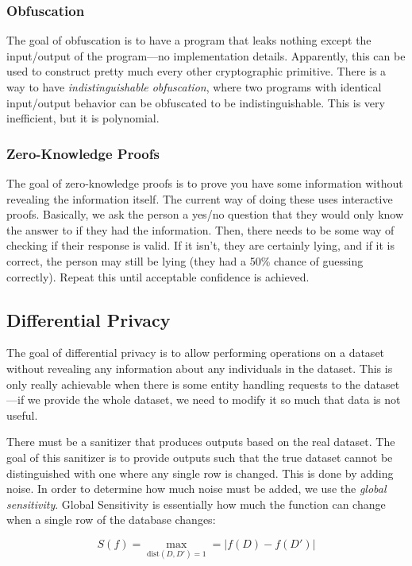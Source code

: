 \documentclass{article}
\begin{document}
\begin{multicols*}{2}
\subsubsection{Obfuscation}
The goal of obfuscation is to have a program that leaks nothing except the input/output of the program---no implementation details. Apparently, this can be used to construct pretty much every other cryptographic primitive. There is a way to have \textit{indistinguishable obfuscation}, where two programs with identical input/output behavior can be obfuscated to be indistinguishable. This is very inefficient, but it is polynomial.

\subsubsection{Zero-Knowledge Proofs}
The goal of zero-knowledge proofs is to prove you have some information without revealing the information itself. The current way of doing these uses interactive proofs. Basically, we ask the person a yes/no question that they would only know the answer to if they had the information. Then, there needs to be some way of checking if their response is valid. If it isn't, they are certainly lying, and if it is correct, the person may still be lying (they had a 50\% chance of guessing correctly). Repeat this until acceptable confidence is achieved. 

\subsection{Differential Privacy}
The goal of differential privacy is to allow performing operations on a dataset without revealing any information about any individuals in the dataset. This is only really achievable when there is some entity handling requests to the dataset---if we provide the whole dataset, we need to modify it so much that data is not useful. 

There must be a sanitizer that produces outputs based on the real dataset. The goal of this sanitizer is to provide outputs such that the true dataset cannot be distinguished with one where any single row is changed. This is done by adding noise. 
In order to determine how much noise must be added, we use the \textit{global sensitivity}. Global Sensitivity is essentially how much the function can change when a single row of the database changes:

\[ S(f) = \max_{\text{dist}(D, D') = 1} = |f(D) - f(D')| \]


\end{multicols*}
\end{document}
